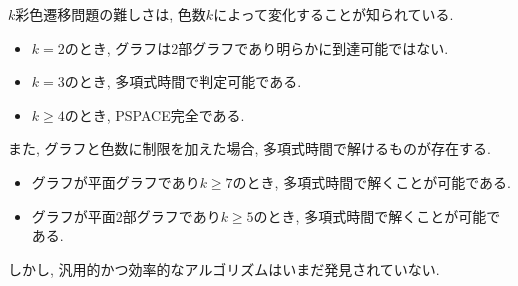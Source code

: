 $k$彩色遷移問題の難しさは, 色数$k$によって変化することが知られている. 
\begin{itemize}
  \item $k = 2$のとき, グラフは2部グラフであり明らかに到達可能ではない.
  \item $k = 3$のとき, 多項式時間で判定可能である. \cite{CHM2008:iwoca}
  \item $k \geq 4$のとき, PSPACE完全である. \cite{BC2009:tcs}
\end{itemize}
また, グラフと色数に制限を加えた場合, 多項式時間で解けるものが存在する. \cite{BC2009:tcs}
\begin{itemize}
  \item グラフが平面グラフであり$k \geq 7$のとき, 多項式時間で解くことが可能である.
  \item グラフが平面2部グラフであり$k \geq 5$のとき, 多項式時間で解くことが可能である.
\end{itemize}
しかし, 汎用的かつ効率的なアルゴリズムはいまだ発見されていない.

